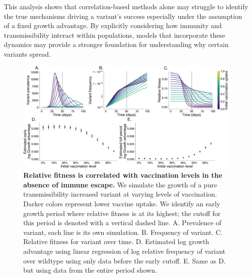 \documentclass[11pt,oneside,letterpaper]{article}
\begin{document}
This analysis shows that correlation-based methods alone may struggle to identify the true mechanisms driving a variant’s success especially under the assumption of a fixed growth advantage.
By explicitly considering how immunity and transmissibility interact within populations, models that incorporate these dynamics may provide a stronger foundation for understanding why certain variants spread.


\begin{figure}[h]
    \centering
    \includegraphics[width=1.0\linewidth]{./figures/mechanism_identification.png}
    \caption{
      \textbf{Relative fitness is correlated with vaccination levels in the absence of immune escape.}
      We simulate the growth of a pure transmissibility increased variant at varying levels of vaccination.
      Darker colors represent lower vaccine uptake.
      We identify an early growth period where relative fitness is at its highest; the cutoff for this period is denoted with a vertical dashed line.
      A. Prevalence of variant, each line is its own simulation.
      B. Frequency of variant.
      C. Relative fitness for variant over time.
      D. Estimated log growth advantage using linear regression of log relative frequency of variant over wildtype using only data before the early cutoff.
      E. Same as D. but using data from the entire period shown.
    }
    \label{fig:mechanism_identification}
\end{figure}
\end{document}

